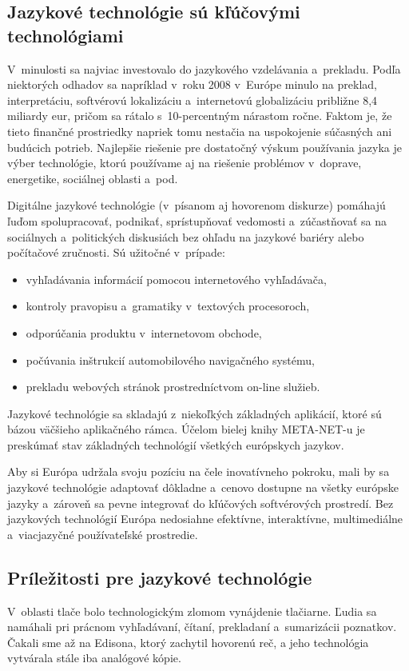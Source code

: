 \begin{multicols}{2}
\subsection{Jazykové technológie sú kľúčovými technológiami}
V~minulosti sa najviac investovalo do jazykového vzdelávania a~prekladu. Podľa
niektorých odhadov sa napríklad v~roku 2008 v~Európe minulo na preklad,
interpretáciu, softvérovú lokalizáciu a~internetovú globalizáciu približne 8,4
miliardy eur, pričom sa rátalo s~10-percentným nárastom ročne.\cite{EC3} Faktom je,
že tieto finančné prostriedky napriek tomu nestačia na uspokojenie súčasných
ani budúcich potrieb. Najlepšie riešenie pre dostatočný výskum používania
jazyka je výber technológie, ktorú používame aj na riešenie problémov
v~doprave, energetike, sociálnej oblasti a~pod.

Digitálne jazykové technológie (v~písanom aj hovorenom diskurze) pomáhajú ľuďom spolupracovať, podnikať, sprístupňovať vedomosti a~zúčastňovať sa na sociálnych a~politických diskusiách bez ohľadu na jazykové bariéry alebo počítačové zručnosti. Sú užitočné v~prípade:

\begin{itemize}
\item vyhľadávania informácií pomocou internetového vyhľadávača,
\item kontroly pravopisu a~gramatiky v~textových procesoroch,
\item odporúčania produktu v~internetovom obchode,
\item počúvania inštrukcií automobilového navigačného systému,
\item prekladu webových stránok prostredníctvom on-line služieb.
\end{itemize}

Jazykové technológie sa skladajú z~niekoľkých základných
aplikácií, ktoré sú bázou väčšieho aplikačného rámca.
Účelom bielej knihy META-NET-u je preskúmať stav základných
technológií všetkých európskych jazykov.

Aby si Európa udržala svoju pozíciu na čele inovatívneho pokroku,
mali by sa jazykové technológie adaptovať dôkladne a~cenovo dostupne
na všetky európske jazyky a~zároveň sa pevne integrovať do
kľúčových softvérových prostredí. Bez jazykových technológií
Európa nedosiahne efektívne, interaktívne, multimediálne
a~viacjazyčné používateľské prostredie.


\subsection{Príležitosti pre jazykové technológie}
V~oblasti tlače bolo technologickým zlomom vynájdenie
tlačiarne. Ľudia sa namáhali pri prácnom vyhľadávaní, čítaní,
prekladaní a~sumarizácii poznatkov. Čakali sme až na Edisona, ktorý
zachytil hovorenú reč, a jeho technológia vytvárala stále iba analógové
kópie.


\end{multicols}
